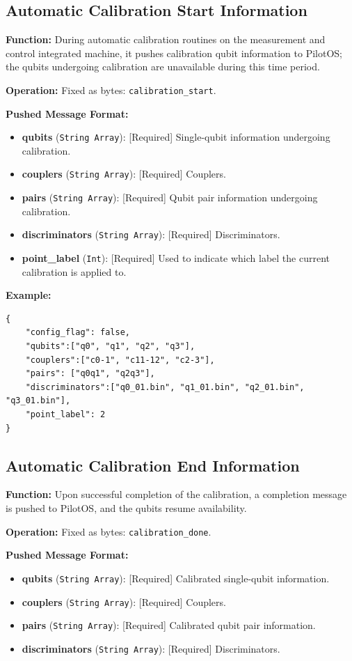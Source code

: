 \documentclass[12pt, a4paper]{article}
\begin{document}
\subsection{Automatic Calibration Start Information}

\textbf{Function:} During automatic calibration routines on the measurement and control integrated machine, it pushes calibration qubit information to PilotOS; the qubits undergoing calibration are unavailable during this time period.

\textbf{Operation:} Fixed as bytes: \texttt{calibration\_start}.

\textbf{Pushed Message Format:}
\begin{itemize}
    \item \textbf{qubits} (\texttt{String Array}): [Required] Single-qubit information undergoing calibration.
    \item \textbf{couplers} (\texttt{String Array}): [Required] Couplers.
    \item \textbf{pairs} (\texttt{String Array}): [Required] Qubit pair information undergoing calibration.
    \item \textbf{discriminators} (\texttt{String Array}): [Required] Discriminators.
    \item \textbf{point\_label} (\texttt{Int}): [Required] Used to indicate which label the current calibration is applied to.
\end{itemize}

\noindent \textbf{Example:}
\begin{lstlisting}
{
    "config_flag": false,
    "qubits":["q0", "q1", "q2", "q3"],
    "couplers":["c0-1", "c11-12", "c2-3"],
    "pairs": ["q0q1", "q2q3"],
    "discriminators":["q0_01.bin", "q1_01.bin", "q2_01.bin", "q3_01.bin"],
    "point_label": 2
}
\end{lstlisting}

\subsection{Automatic Calibration End Information}

\textbf{Function:} Upon successful completion of the calibration, a completion message is pushed to PilotOS, and the qubits resume availability.

\textbf{Operation:} Fixed as bytes: \texttt{calibration\_done}.

\textbf{Pushed Message Format:}
\begin{itemize}
    \item \textbf{qubits} (\texttt{String Array}): [Required] Calibrated single-qubit information.
    \item \textbf{couplers} (\texttt{String Array}): [Required] Couplers.
    \item \textbf{pairs} (\texttt{String Array}): [Required] Calibrated qubit pair information.
    \item \textbf{discriminators} (\texttt{String Array}): [Required] Discriminators.
\end{itemize}
\end{document}
